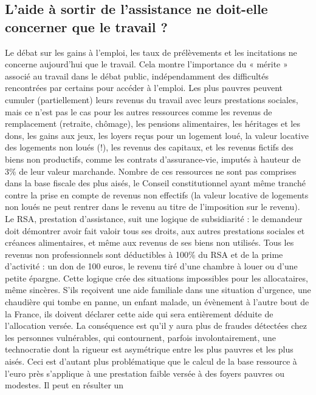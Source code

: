 \documentclass[
  french,
]{article}
\begin{document}
\subsection{L'aide à sortir de l'assistance ne doit-elle concerner que
le travail
?}\label{laide-uxe0-sortir-de-lassistance-ne-doit-elle-concerner-que-le-travail}

Le débat sur les gains à l'emploi, les taux de prélèvements et les
incitations ne concerne aujourd'hui que le travail. Cela montre
l'importance du « mérite » associé au travail dans le débat public,
indépendamment des difficultés rencontrées par certains pour accéder à
l'emploi. Les plus pauvres peuvent cumuler (partiellement) leurs revenus
du travail avec leurs prestations sociales, mais ce n'est pas le cas
pour les autres ressources comme les revenus de remplacement (retraite,
chômage), les pensions alimentaires, les héritages et les dons, les
gains aux jeux, les loyers reçus pour un logement loué, la valeur
locative des logements non loués (!), les revenus des capitaux, et les
revenus fictifs des biens non productifs, comme les contrats
d'assurance-vie, imputés à hauteur de 3\% de leur valeur marchande.
Nombre de ces ressources ne sont pas comprises dans la base fiscale des
plus aisés, le Conseil constitutionnel ayant même tranché contre la
prise en compte de revenus non effectifs (la valeur locative de
logements non loués ne peut rentrer dans le revenu au titre de
l'imposition sur le revenu). Le RSA, prestation d'assistance, suit une
logique de subsidiarité : le demandeur doit démontrer avoir fait valoir
tous ses droits, aux autres prestations sociales et créances
alimentaires, et même aux revenus de ses biens non utilisés. Tous les
revenus non professionnels sont déductibles à 100\% du RSA et de la
prime d'activité : un don de 100 euros, le revenu tiré d'une chambre à
louer ou d'une petite épargne. Cette logique crée des situations
impossibles pour les allocataires, même sincères. S'ils reçoivent une
aide familiale dans une situation d'urgence, une chaudière qui tombe en
panne, un enfant malade, un évènement à l'autre bout de la France, ils
doivent déclarer cette aide qui sera entièrement déduite de l'allocation
versée. La conséquence est qu'il y aura plus de fraudes détectées chez
les personnes vulnérables, qui contournent, parfois involontairement,
une technocratie dont la rigueur est asymétrique entre les plus pauvres
et les plus aisés. Ceci est d'autant plus problématique que le calcul de
la base ressource à l'euro près s'applique à une prestation faible
versée à des foyers pauvres ou modestes. Il peut en résulter un
\end{document}
